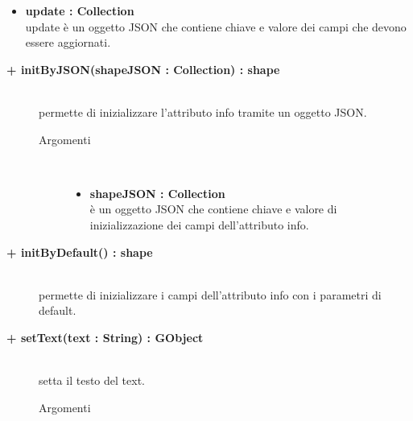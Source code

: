 \begin{description}
\begin{description}
\begin{description}
\begin{itemize}
					\item \textbf{update : Collection			} \hfill \\
					update è un oggetto JSON che contiene chiave e valore dei campi che devono essere aggiornati. 
				\end{itemize}
		\end{description}

\end{description}

\begin{description}
		\item[\textbf{\color{blue}+ initByJSON(shapeJSON : Collection) : shape			}] \hfill \\
			permette di inizializzare l'attributo info tramite un oggetto JSON. 
			
		\begin{description}
			\item[Argomenti] \hfill \\
				\begin{itemize}
				
					\item \textbf{shapeJSON : Collection			} \hfill \\
					è un oggetto JSON che contiene chiave e valore di inizializzazione dei campi dell'attributo info. 
				\end{itemize}
		\end{description}

\end{description}

\begin{description}
		\item[\textbf{\color{blue}+ initByDefault() : shape			}] \hfill \\
			permette di inizializzare i campi dell'attributo info con i parametri di default. 

\end{description}

\begin{description}
		\item[\textbf{\color{blue}+ setText(text : String) : GObject			}] \hfill \\
			setta il testo del text.
			
		\begin{description}
			\item[Argomenti] \hfill \\
				\begin{itemize}
				

\end{itemize}
\end{description}
\end{description}
\end{description}
